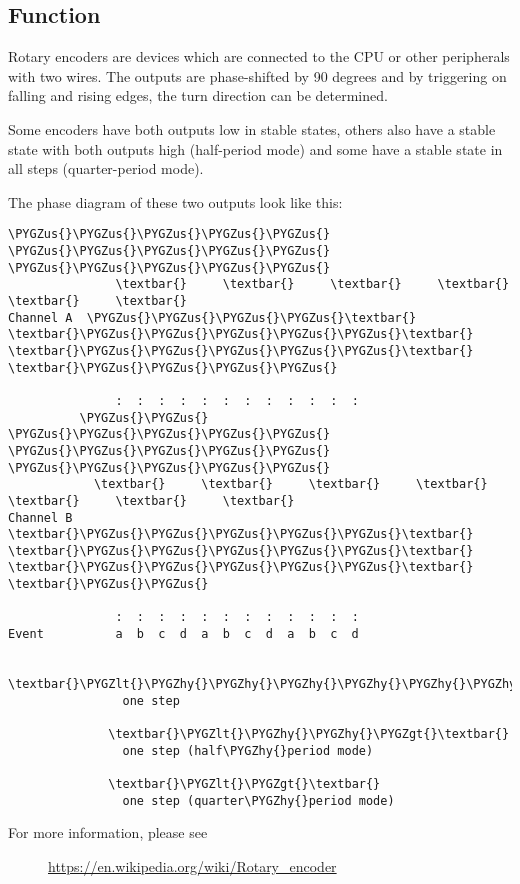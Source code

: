 \documentclass[a4paper,8pt,english]{sphinxmanual}
\def\PYGZus{\char`\_}
\def\PYGZlt{\char`\<}
\def\PYGZgt{\char`\>}
\def\PYGZhy{\char`\-}
\begin{document}
\subsection{Function}
\label{input/devices/rotary-encoder:function}
Rotary encoders are devices which are connected to the CPU or other
peripherals with two wires. The outputs are phase-shifted by 90 degrees
and by triggering on falling and rising edges, the turn direction can
be determined.

Some encoders have both outputs low in stable states, others also have
a stable state with both outputs high (half-period mode) and some have
a stable state in all steps (quarter-period mode).

The phase diagram of these two outputs look like this:

\begin{Verbatim}[commandchars=\\\{\}]
                \PYGZus{}\PYGZus{}\PYGZus{}\PYGZus{}\PYGZus{}       \PYGZus{}\PYGZus{}\PYGZus{}\PYGZus{}\PYGZus{}       \PYGZus{}\PYGZus{}\PYGZus{}\PYGZus{}\PYGZus{}
               \textbar{}     \textbar{}     \textbar{}     \textbar{}     \textbar{}     \textbar{}
Channel A  \PYGZus{}\PYGZus{}\PYGZus{}\PYGZus{}\textbar{}     \textbar{}\PYGZus{}\PYGZus{}\PYGZus{}\PYGZus{}\PYGZus{}\textbar{}     \textbar{}\PYGZus{}\PYGZus{}\PYGZus{}\PYGZus{}\PYGZus{}\textbar{}     \textbar{}\PYGZus{}\PYGZus{}\PYGZus{}\PYGZus{}

               :  :  :  :  :  :  :  :  :  :  :  :
          \PYGZus{}\PYGZus{}       \PYGZus{}\PYGZus{}\PYGZus{}\PYGZus{}\PYGZus{}       \PYGZus{}\PYGZus{}\PYGZus{}\PYGZus{}\PYGZus{}       \PYGZus{}\PYGZus{}\PYGZus{}\PYGZus{}\PYGZus{}
            \textbar{}     \textbar{}     \textbar{}     \textbar{}     \textbar{}     \textbar{}     \textbar{}
Channel B   \textbar{}\PYGZus{}\PYGZus{}\PYGZus{}\PYGZus{}\PYGZus{}\textbar{}     \textbar{}\PYGZus{}\PYGZus{}\PYGZus{}\PYGZus{}\PYGZus{}\textbar{}     \textbar{}\PYGZus{}\PYGZus{}\PYGZus{}\PYGZus{}\PYGZus{}\textbar{}     \textbar{}\PYGZus{}\PYGZus{}

               :  :  :  :  :  :  :  :  :  :  :  :
Event          a  b  c  d  a  b  c  d  a  b  c  d

              \textbar{}\PYGZlt{}\PYGZhy{}\PYGZhy{}\PYGZhy{}\PYGZhy{}\PYGZhy{}\PYGZhy{}\PYGZhy{}\PYGZhy{}\PYGZgt{}\textbar{}
                one step

              \textbar{}\PYGZlt{}\PYGZhy{}\PYGZhy{}\PYGZgt{}\textbar{}
                one step (half\PYGZhy{}period mode)

              \textbar{}\PYGZlt{}\PYGZgt{}\textbar{}
                one step (quarter\PYGZhy{}period mode)
\end{Verbatim}
\begin{description}
\item[{For more information, please see}] \leavevmode
\href{https://en.wikipedia.org/wiki/Rotary\_encoder}{https://en.wikipedia.org/wiki/Rotary\_encoder}

\end{description}
\end{document}
